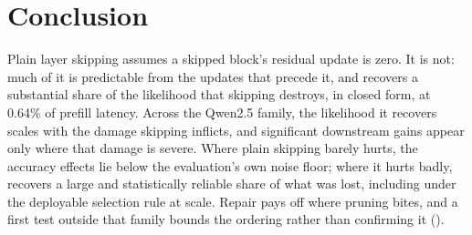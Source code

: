 \section{Conclusion}
\label{sec:conclusion}

Plain layer skipping assumes a skipped block's residual update is zero. It is not: much of it
is predictable from the updates that precede it, and \mname recovers a substantial share of
the likelihood that skipping destroys, in closed form, at 0.64\% of prefill latency.
Across the Qwen2.5 family, the likelihood it recovers scales with the damage skipping
inflicts, and significant downstream gains appear only where that damage is severe. Where plain
skipping barely hurts, the accuracy effects lie below the evaluation's own noise floor; where
it hurts badly, \mname recovers a large and statistically reliable share of what was lost,
including under the deployable selection rule at scale. Repair pays off where pruning bites, and a first test outside that family bounds the ordering rather than
confirming it ().
